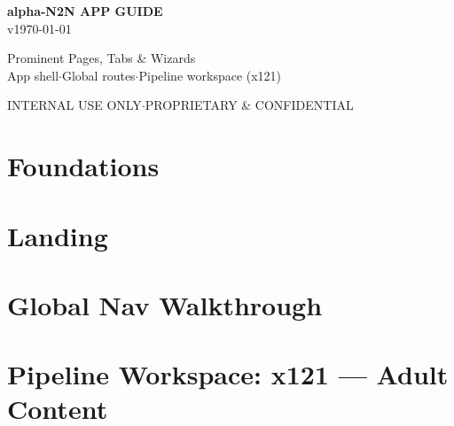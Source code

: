 \documentclass[11pt,a4paper,oneside]{book}
\begin{document}
\begin{titlepage}
  \centering
  \vspace*{3cm}

  {\sffamily\fontsize{28}{34}\selectfont\bfseries\textcolor{appT}{alpha-N2N APP GUIDE}}\\[0.8em]
  {\sffamily\large\textcolor{appGray}{v\today}}

  \vspace{3cm}

  {\normalsize Prominent Pages, Tabs \& Wizards}\\[0.8em]
  {\normalsize App shell\enspace$\cdot$\enspace Global routes\enspace$\cdot$\enspace Pipeline workspace (x121)}

  \vfill

  {\small\textcolor{appGray}{INTERNAL USE ONLY\enspace$\cdot$\enspace PROPRIETARY \& CONFIDENTIAL}}
\end{titlepage}

\tableofcontents
\newpage

\part{Foundations}




\part{Landing}



\part{Global Nav Walkthrough}





\part{Pipeline Workspace: x121 — Adult Content}


\appendix


\end{document}

